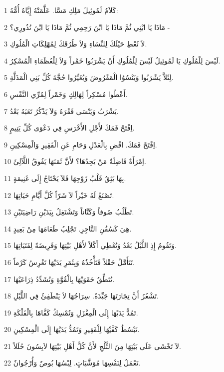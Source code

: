 \par 1 كَلاَمُ لَمُوئِيلَ مَلِكِ مَسَّا. عَلَّمَتْهُ إِيَّاهُ أُمُّهُ:
\par 2 مَاذَا يَا ابْنِي ثُمَّ مَاذَا يَا ابْنَ رَحِمِي ثُمَّ مَاذَا يَا ابْنَ نُذُورِي؟ -
\par 3 لاَ تُعْطِ حَيْلَكَ لِلنِّسَاءِ وَلاَ طُرُقَكَ لِمُهْلِكَاتِ الْمُلُوكِ.
\par 4 لَيْسَ لِلْمُلُوكِ يَا لَمُوئِيلُ لَيْسَ لِلْمُلُوكِ أَنْ يَشْرَبُوا خَمْراً وَلاَ لِلْعُظَمَاءِ الْمُسْكِرُ.
\par 5 لِئَلاَّ يَشْرَبُوا وَيَنْسُوُا الْمَفْرُوضَ وَيُغَيِّرُوا حُجَّةَ كُلِّ بَنِي الْمَذَلَّةِ.
\par 6 أَعْطُوا مُسْكِراً لِهَالِكٍ وَخَمْراً لِمُرِّي النَّفْسِ.
\par 7 يَشْرَبُ وَيَنْسَى فَقْرَهُ وَلاَ يَذْكُرُ تَعَبَهُ بَعْدُ.
\par 8 اِفْتَحْ فَمَكَ لأَجْلِ الأَخْرَسِ فِي دَعْوَى كُلِّ يَتِيمٍ.
\par 9 اِفْتَحْ فَمَكَ. اقْضِ بِالْعَدْلِ وَحَامِ عَنِ الْفَقِيرِ وَالْمِسْكِينِ.
\par 10 اِمْرَأَةٌ فَاضِلَةٌ مَنْ يَجِدُهَا؟ لأَنَّ ثَمَنَهَا يَفُوقُ اللَّآلِئَ.
\par 11 بِهَا يَثِقُ قَلْبُ زَوْجِهَا فَلاَ يَحْتَاجُ إِلَى غَنِيمَةٍ.
\par 12 تَصْنَعُ لَهُ خَيْراً لاَ شَرّاً كُلَّ أَيَّامِ حَيَاتِهَا.
\par 13 تَطْلُبُ صُوفاً وَكَتَّاناً وَتَشْتَغِلُ بِيَدَيْنِ رَاضِيَتَيْنِ.
\par 14 هِيَ كَسُفُنِ التَّاجِرِ. تَجْلِبُ طَعَامَهَا مِنْ بَعِيدٍ.
\par 15 وَتَقُومُ إِذِ اللَّيْلُ بَعْدُ وَتُعْطِي أَكْلاً لأَهْلِ بَيْتِهَا وَفَرِيضَةً لِفَتَيَاتِهَا.
\par 16 تَتَأَمَّلُ حَقْلاً فَتَأْخُذُهُ وَبِثَمَرِ يَدَيْهَا تَغْرِسُ كَرْماً.
\par 17 تُنَطِّقُ حَقَوَيْهَا بِالْقُوَّةِ وَتُشَدِّدُ ذِرَاعَيْهَا.
\par 18 تَشْعُرُ أَنَّ تِجَارَتَهَا جَيِّدَةٌ. سِرَاجُهَا لاَ يَنْطَفِئُ فِي اللَّيْلِ.
\par 19 تَمُدُّ يَدَيْهَا إِلَى الْمِغْزَلِ وَتُمْسِكُ كَفَّاهَا بِالْفَلْكَةِ.
\par 20 تَبْسُطُ كَفَّيْهَا لِلْفَقِيرِ وَتَمُدُّ يَدَيْهَا إِلَى الْمِسْكِينِ.
\par 21 لاَ تَخْشَى عَلَى بَيْتِهَا مِنَ الثَّلْجِ لأَنَّ كُلَّ أَهْلِ بَيْتِهَا لاَبِسُونَ حُلَلاً.
\par 22 تَعْمَلُ لِنَفْسِهَا مُوَشَّيَاتٍ. لِبْسُهَا بُوصٌ وَأُرْجُوانٌ.
